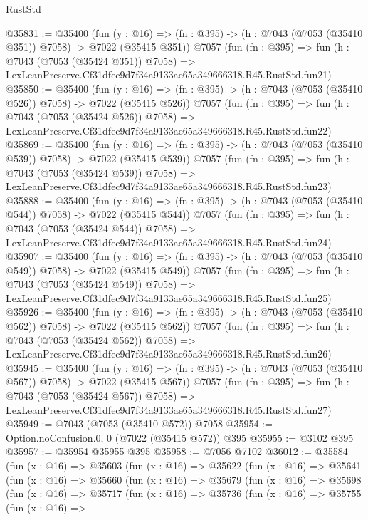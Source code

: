 \begin{lexlean}{RustStd}
\begin{coremodule}
@35831 := @35400
    (fun (y : @16) => (fn : @395) -> (h : @7043 (@7053 (@35410 @351)) @7058) -> @7022 (@35415 @351))
    @7057
    (fun (fn : @395) =>
    fun (h : @7043 (@7053 (@35424 @351)) @7058) =>
    LexLeanPreserve.Cf31dfec9d7f34a9133ae65a349666318.R45.RustStd.fun21)
@35850 := @35400
    (fun (y : @16) => (fn : @395) -> (h : @7043 (@7053 (@35410 @526)) @7058) -> @7022 (@35415 @526))
    @7057
    (fun (fn : @395) =>
    fun (h : @7043 (@7053 (@35424 @526)) @7058) =>
    LexLeanPreserve.Cf31dfec9d7f34a9133ae65a349666318.R45.RustStd.fun22)
@35869 := @35400
    (fun (y : @16) => (fn : @395) -> (h : @7043 (@7053 (@35410 @539)) @7058) -> @7022 (@35415 @539))
    @7057
    (fun (fn : @395) =>
    fun (h : @7043 (@7053 (@35424 @539)) @7058) =>
    LexLeanPreserve.Cf31dfec9d7f34a9133ae65a349666318.R45.RustStd.fun23)
@35888 := @35400
    (fun (y : @16) => (fn : @395) -> (h : @7043 (@7053 (@35410 @544)) @7058) -> @7022 (@35415 @544))
    @7057
    (fun (fn : @395) =>
    fun (h : @7043 (@7053 (@35424 @544)) @7058) =>
    LexLeanPreserve.Cf31dfec9d7f34a9133ae65a349666318.R45.RustStd.fun24)
@35907 := @35400
    (fun (y : @16) => (fn : @395) -> (h : @7043 (@7053 (@35410 @549)) @7058) -> @7022 (@35415 @549))
    @7057
    (fun (fn : @395) =>
    fun (h : @7043 (@7053 (@35424 @549)) @7058) =>
    LexLeanPreserve.Cf31dfec9d7f34a9133ae65a349666318.R45.RustStd.fun25)
@35926 := @35400
    (fun (y : @16) => (fn : @395) -> (h : @7043 (@7053 (@35410 @562)) @7058) -> @7022 (@35415 @562))
    @7057
    (fun (fn : @395) =>
    fun (h : @7043 (@7053 (@35424 @562)) @7058) =>
    LexLeanPreserve.Cf31dfec9d7f34a9133ae65a349666318.R45.RustStd.fun26)
@35945 := @35400
    (fun (y : @16) => (fn : @395) -> (h : @7043 (@7053 (@35410 @567)) @7058) -> @7022 (@35415 @567))
    @7057
    (fun (fn : @395) =>
    fun (h : @7043 (@7053 (@35424 @567)) @7058) =>
    LexLeanPreserve.Cf31dfec9d7f34a9133ae65a349666318.R45.RustStd.fun27)
@35949 := @7043 (@7053 (@35410 @572)) @7058
@35954 := Option.noConfusion.{0, 0} (@7022 (@35415 @572)) @395
@35955 := @3102 @395
@35957 := @35954 @35955 @395
@35958 := @7056 @7102
@36012 := @35584
    (fun (x : @16) =>
    @35603
      (fun (x : @16) =>
      @35622
        (fun (x : @16) =>
        @35641
          (fun (x : @16) =>
          @35660
            (fun (x : @16) =>
            @35679
              (fun (x : @16) =>
              @35698
                (fun (x : @16) =>
                @35717
                  (fun (x : @16) =>
                  @35736
                    (fun (x : @16) =>
                    @35755
                      (fun (x : @16) =>

\end{coremodule}
\end{lexlean}
